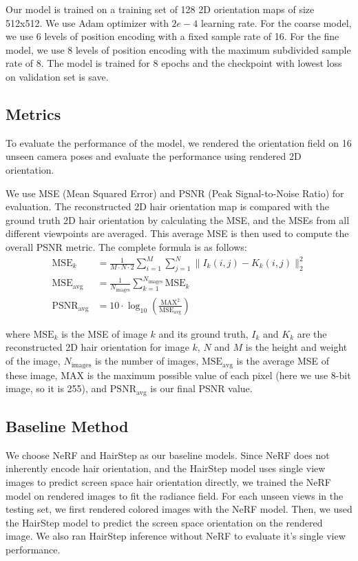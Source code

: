 \documentclass{article}
\begin{document}
Our model is trained on a training set of 128 2D orientation maps of size 512x512. We use Adam optimizer with $2e-4$ learning rate. For the coarse model, we use 6 levels of position encoding with a fixed sample rate of 16. For the fine model, we use 8 levels of position encoding with the maximum subdivided sample rate of 8. The model is trained for 8 epochs and the checkpoint with lowest loss on validation set is save.

\subsection{Metrics}

To evaluate the performance of the model, we rendered the orientation field on 16 unseen camera poses and evaluate the performance using rendered 2D orientation.

We use MSE (Mean Squared Error) and PSNR (Peak Signal-to-Noise Ratio) for evaluation. The reconstructed 2D hair orientation map is compared with the ground truth 2D hair orientation by calculating the MSE, and the MSEs from all different viewpoints are averaged. This average MSE is then used to compute the overall PSNR metric. The complete formula is as follows:
\begin{align}
    \text{MSE}_k &=
    \frac{1}{M \cdot N \cdot 2}
     \sum_{i=1}^M \sum_{j=1}^N \| I_k (i,j) - K_k(i,j)\|_2 ^2 \\
    \text{MSE}_\text{avg} &= \frac{1}{N_\text{images}} \sum_{k=1}^{N_\text{images}}\text{MSE}_k \\
    \text{PSNR}_\text{avg} &= 10 \cdot \log_{10} \left( \frac{\text{MAX}^2}{\text{MSE}_{\text{avg}}} \right)
\end{align}

where $\text{MSE}_k$ is the MSE of image $k$ and its ground truth, $I_k$ and $K_k$ are the reconstructed 2D hair orientation for image $k$, $N$ and $M$ is the height and weight of the image, $N_\text{images}$ is the number of images, $\text{MSE}_\text{avg}$ is the average MSE of these image, MAX is the maximum possible value of each pixel (here we use 8-bit image, so it is 255), and $\text{PSNR}_\text{avg}$ is our final PSNR value.

\subsection{Baseline Method}

We choose NeRF \cite{mildenhall_nerf_2020} and HairStep \cite{zheng_hairstep_2023} as our baseline models. Since NeRF does not inherently encode hair orientation, and the HairStep model uses single view images to predict screen space hair orientation directly, we trained the NeRF model on rendered images to fit the radiance field. For each unseen views in the testing set, we first rendered colored images with the NeRF model. Then, we used the HairStep model to predict the screen space orientation on the rendered image. We also ran HairStep inference without NeRF to evaluate it's single view performance.
\end{document}

